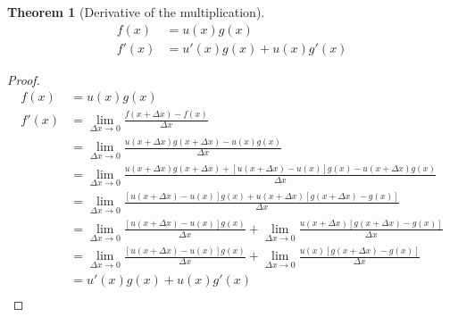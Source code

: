 \documentclass{article}
\newtheorem{theorem}{Theorem}[section]
\theoremstyle{definition}
\begin{document}
\begin{theorem}[Derivative of the multiplication]\label{theorems:calculus:derivatives:multiplication}
	\begin{align*}
	f(x)&=u(x)g(x)\\
	f'(x)&=u'(x)g(x) + u(x)g'(x)
	\end{align*}
\end{theorem}
\begin{proof}
	\begin{align*}
	f(x) &= u(x)g(x) \\
	f'(x) &= \lim_{\Delta x \to 0} {\frac {f(x+\Delta x) - f(x)} {\Delta x}} \\
	&= \lim_{\Delta x \to 0} {\frac {u(x+\Delta x)g(x+\Delta x) - u(x)g(x)} {\Delta x}} \\
	&= \lim_{\Delta x \to 0} {\frac {u(x+\Delta x)g(x+\Delta x) + [u(x+\Delta x) - u(x)]g(x) - u(x+\Delta x)g(x) } {\Delta x}} \\
	&= \lim_{\Delta x \to 0} {\frac {[u(x+\Delta x) - u(x)]g(x) + u(x+\Delta x)[g(x+\Delta x) - g(x)]} {\Delta x}} \\
	&= \lim_{\Delta x \to 0} {\frac {[u(x+\Delta x) - u(x)]g(x)} {\Delta x}} + \lim_{\Delta x \to 0} {\frac {u(x+\Delta x)[g(x+\Delta x) - g(x)]} {\Delta x}} \\
	&= \lim_{\Delta x \to 0} {\frac {[u(x+\Delta x) - u(x)]g(x)} {\Delta x}} + \lim_{\Delta x \to 0} {\frac {u(x)[g(x+\Delta x) - g(x)]} {\Delta x}} \\
	&= u'(x)g(x)+ u(x)g'(x) \\
	\end{align*}
\end{proof}
\end{document}
